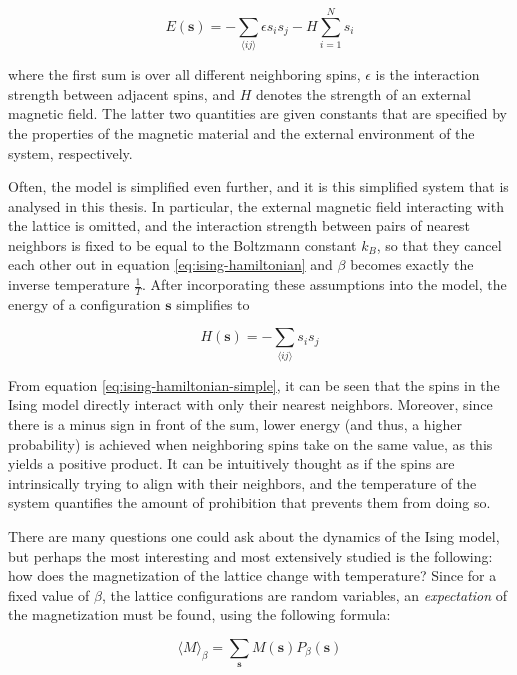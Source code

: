 \documentclass[12pt]{article}
\begin{document}
\begin{equation}
E(\boldsymbol{s}) = - \sum_{\langle ij \rangle} \epsilon s_i s_j - H \sum_{i=1}^N s_i
\label{eq:ising-hamiltonian}
\end{equation}

where the first sum is over all different neighboring spins, $\epsilon$ is the interaction strength between adjacent spins, and $H$ denotes the strength of an external magnetic field. The latter two quantities are given constants that are specified by the properties of the magnetic material and the external environment of the system, respectively.

Often, the model is simplified even further, and it is this simplified system that is analysed in this thesis. In particular, the external magnetic field interacting with the lattice is omitted, and the interaction strength between pairs of nearest neighbors is fixed to be equal to the Boltzmann constant $k_B$, so that they cancel each other out in equation \ref{eq:ising-hamiltonian} and $\beta$ becomes exactly the inverse temperature $\frac{1}{T}$. After incorporating these assumptions into the model, the energy of a configuration $\boldsymbol{s}$ simplifies to 

\begin{equation}
H(\boldsymbol{s}) = - \sum_{\langle ij \rangle} s_i s_j
\label{eq:ising-hamiltonian-simple}
\end{equation}

From equation \ref{eq:ising-hamiltonian-simple}, it can be seen that the spins in the Ising model directly interact with only their nearest neighbors. Moreover, since there is a minus sign in front of the sum, lower energy (and thus, a higher probability) is achieved when neighboring spins take on the same value, as this yields a positive product. It can be intuitively thought as if the spins are intrinsically trying to align with their neighbors, and the temperature of the system quantifies the amount of prohibition that prevents them from doing so. 

There are many questions one could ask about the dynamics of the Ising model, but perhaps the most interesting and most extensively studied is the following: how does the magnetization of the lattice change with temperature? Since for a fixed value of $\beta$, the lattice configurations are random variables, an \textit{expectation} of the magnetization must be found, using the following formula:

\begin{equation}
\langle M \rangle_\beta = \sum_{\boldsymbol{s}} M(\boldsymbol{s}) P_\beta(\boldsymbol{s})
\label{eq:expected-mag-ising}
\end{equation}
\end{document}
